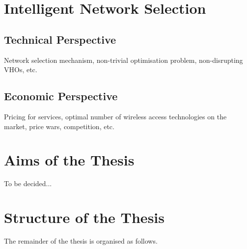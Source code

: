 \section{Intelligent Network Selection} %
\label{sec:intelligent_network_selection}

\subsection{Technical Perspective} %
\label{sub:technical_perspective}
Network selection mechanism, non-trivial optimisation problem, non-disrupting VHOs, etc.

\subsection{Economic Perspective} %
\label{sub:economic_perspective}
Pricing for services, optimal number of wireless access technologies on the market, price wars, competition, etc.


\section{Aims of the Thesis} %
\label{sec:aims_of_the_thesis}
To be decided...

\section{Structure of the Thesis} %
\label{sec:structure_of_the_thesis}
The remainder of the thesis is organised as follows.

